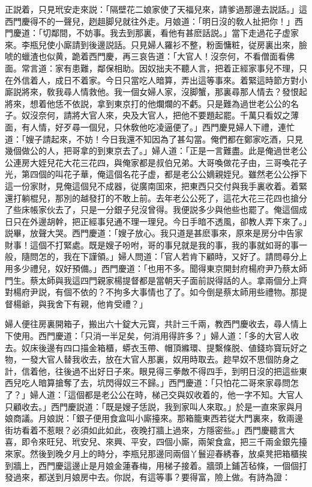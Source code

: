 正説着，只見玳安走來説：「隔壁花二娘家使了天福兒來，請爹過那邊去説話。」這西門慶得不的一聲兒，趔趄脚兒就往外走。月娘道：「明日沒的敎人扯把你！」西門慶道：「切鄰間，不妨事。我去到那裏，看他有甚麽話説。」當下走過花子虚家來。李瓶兒使小廝請到後邊説話。只見婦人羅衫不整，粉面慵粧，従房裏出來，臉唬的蠟渣也似黄，跪着西門慶，再三哀告道：「大官人！沒奈何，不看僧面看佛面。常言道：家有患難，鄰保相助。因奴拙夫不聽人言，把着正經家事兒不理，只在外信着人，成日不着家。今日只當吃人暗算，弄出這等事來。着緊這時節方對小廝説將來，敎我尋人情救他。我一個女婦人家，沒脚蟹，那裏尋那人情去？發恨起將來，想着他恁不依説，拿到東京打的他爛爛的不虧。只是難為過世老公公的名子。奴沒奈何，請將大官人來，央及大官人，把他不要題起罷。千萬只看奴之薄面，有人情，好歹尋一個兒，只休敎他吃凌逼便了。」西門慶見婦人下禮，連忙道：「嫂子請起來，不妨！今日我還不知因為了甚勾當。俺們都在鄭家吃酒，只見幾個做公的人，把哥拿的到東京去了。」婦人道：「正是一言難盡。此是俺過世老公公連房大姪兒花大花三花四，與俺家都是叔伯兄弟。大哥喚做花子由，三哥喚花子光，第四個的叫花子華，俺這個名花子虚，都是老公公嫡親姪兒。雖然老公公掙下這一份家財，見俺這個兒不成器，従廣南囬來，把東西只交付與我手裏收着。着緊還打躺棍兒，那別的越發打的不敢上前。去年老公公死了，這花大花三花四也搶分了些床帳家伙去了，只是一分銀子兒沒曾得。我便説多少與他些也罷了。俺這個成日只在外邊胡幹，把正經事兒通不理一理兒。今日手暗不透風，卻教人弄下來了。」説畢，放聲大哭。西門慶道：「嫂子放心。我只道是甚麽事來，原來是房分中告家財事！這個不打緊處。既是嫂子吩咐，哥的事兒就是我的事，我的事就如哥的事一般，隨問怎的，我在下謹領。」婦人問道：「官人若肯下顧時，又好了。請問尋分上用多少禮兒，奴好預備。」西門慶道：「也用不多。聞得東京開封府楊府尹乃蔡太師門生。蔡太師與我這四門親家楊提督都是當朝天子面前説得話的人。拿兩個分上齊對楊府尹説，有個不依的？不拘多大事情也了了。如今倒是蔡太師用些禮物。那提督楊爺，與我舍下有親，他肯受禮？」

婦人便往房裏開箱子，搬出六十錠大元寳，共計三千兩，教西門慶收去，尋人情上下使用。西門慶道：「只消一半足矣，何消用得許多？」婦人道：「多的大官人收去。奴床後邊有四口描金箱櫃，蟒衣玉帶、帽頂縧環、提繫條脱、値錢珎寳玩好之物，一發大官人替我收去，放在大官人那裏，奴用時取去。趂早奴不思個防身之計，信着他，往後過不出好日子來。眼見得三拳敵不得四手，到明日沒的把這些東西兒吃人暗算搶奪了去，坑閃得奴三不歸。」西門慶道：「只怕花二哥來家尋問怎了？」婦人道：「這個都是老公公在時，梯己交與奴收着的，他一字不知。大官人只顧收去。」西門慶説道：「既是嫂子恁説，我到家叫人來取。」於是一直來家與月娘商議。月娘説：「銀子便用食盒叫小廝擡來。那箱籠東西若従大門裏來，敎兩邊街坊看着不惹眼？必須如此如此，夜晚打牆上過來，方隱密些。」西門慶聽言大喜，即令來旺兒、玳安兒、來興、平安，四個小廝，兩架食盒，把三千兩金銀先擡來家。然後到晚夕月上的時分，李瓶兒那邊同兩個丫鬟迎春綉春，放桌凳把箱櫃挨到牆上，西門慶這邊止是月娘金蓮春梅，用梯子接着。牆頭上鋪苫毡條，一個個打發過來，都送到月娘房中去。你説，有這等事？要得富，險上做。有詩為證：

